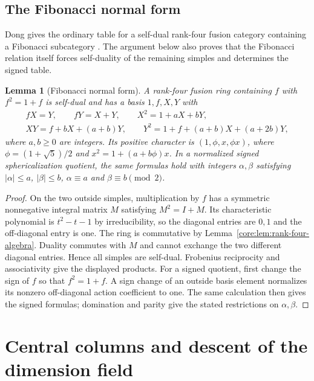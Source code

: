 \documentclass[11pt,a4paper]{article}
\newtheorem{lemma}[theorem]{Lemma}
\theoremstyle{definition}\newtheorem{definition}[theorem]{Definition}
\theoremstyle{remark}\newtheorem{remark}[theorem]{Remark}
\numberwithin{equation}{section}
\begin{document}
\subsection{The Fibonacci normal form}\label{sec:fib}
Dong gives the ordinary table for a self-dual rank-four fusion
category containing a Fibonacci subcategory
\cite[Proposition~3.3]{DongFour}. The argument below also proves
that the Fibonacci relation itself forces self-duality of the
remaining simples and determines the signed table.
\begin{lemma}[Fibonacci normal form]\label{fib:lem:normal-form}
A rank-four fusion ring containing $f$ with $f^2=1+f$ is self-dual
and has a basis $1,f,X,Y$ with
\begin{equation}\label{fib:eq:fib-auto-rules}
\begin{gathered}
 fX=Y,\qquad fY=X+Y,\qquad X^2=1+aX+bY,\\
 XY=f+bX+(a+b)Y,\qquad
 Y^2=1+f+(a+b)X+(a+2b)Y,
\end{gathered}
\end{equation}
where $a,b\ge0$ are integers. Its positive character is
$(1,\phi,x,\phi x)$, where $\phi=(1+\sqrt5)/2$ and
$x^2=1+(a+b\phi)x$. In a normalized signed sphericalization quotient,
the same formulas hold with integers $\alpha,\beta$ satisfying
$|\alpha|\le a$, $|\beta|\le b$, $\alpha\equiv a$ and
$\beta\equiv b\pmod2$.
\end{lemma}
\begin{proof}
On the two outside simples, multiplication by $f$ has a symmetric
nonnegative integral matrix $M$ satisfying $M^2=I+M$. Its characteristic
polynomial is $t^2-t-1$ by irreducibility, so the diagonal entries are
$0,1$ and the off-diagonal entry is one. The ring is commutative by
Lemma~\ref{core:lem:rank-four-algebra}. Duality commutes with $M$ and
cannot exchange the two different diagonal entries. Hence all simples
are self-dual. Frobenius reciprocity and associativity give the displayed products.
For a signed quotient, first change the sign of $f$ so that
$f^2=1+f$. A sign change of an outside basis element normalizes its
nonzero off-diagonal action coefficient to one. The same calculation
then gives the signed formulas; domination and parity give the stated
restrictions on $\alpha,\beta$.
\end{proof}

\section{Central columns and descent of the dimension field}\label{sec:central-columns}
\end{document}
